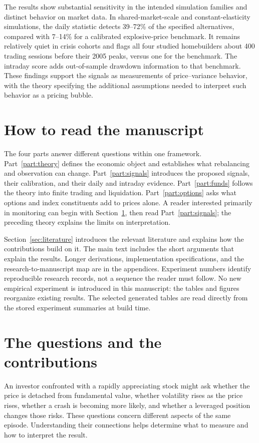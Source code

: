 The results show substantial sensitivity in the intended simulation
families and distinct behavior on market data. In shared-market-scale
and constant-elasticity simulations, the daily statistic detects 39--72\%
of the specified alternatives, compared with 7--14\% for a calibrated
explosive-price benchmark. It remains relatively quiet in crisis cohorts
and flags all four studied homebuilders about 400 trading sessions before
their 2005 peaks, versus one for the benchmark. The intraday score adds
out-of-sample drawdown information to that benchmark. These findings
support the signals as measurements of price--variance behavior, with
the theory specifying the additional assumptions needed to interpret
such behavior as a pricing bubble.

\section*{How to read the manuscript}
{}
The four parts answer different questions within one framework.
Part~\ref{part:theory} defines the economic object and establishes what
rebalancing and observation can change. Part~\ref{part:signals} introduces the
proposed signals, their calibration, and their daily and intraday evidence.
Part~\ref{part:funds} follows the theory into finite trading and liquidation.
Part~\ref{part:options} asks what options and index constituents add to prices
alone. A reader interested primarily in monitoring can begin with
Section~\ref{sec:targets}, then read Part~\ref{part:signals}; the preceding
theory explains the limits on interpretation.

Section~\ref{sec:literature} introduces the relevant literature and explains
how the contributions build on it. The main text includes the short arguments that explain the results. Longer
derivations, implementation specifications, and the research-to-manuscript map
are in the appendices. Experiment numbers identify reproducible research
records, not a sequence the reader must follow. No new empirical experiment is
introduced in this manuscript: the tables and figures reorganize existing
results. The selected generated tables are read directly from the stored
experiment summaries at build time.

\clearpage
\tableofcontents
\clearpage
{}
\section{The questions and the contributions}\label{sec:targets}
An investor confronted with a rapidly appreciating stock might ask whether
the price is detached from fundamental value, whether volatility rises as
the price rises, whether a crash is becoming more likely, and whether a
leveraged position changes those risks. These questions concern different
aspects of the same episode. Understanding their connections helps determine
what to measure and how to interpret the result.

